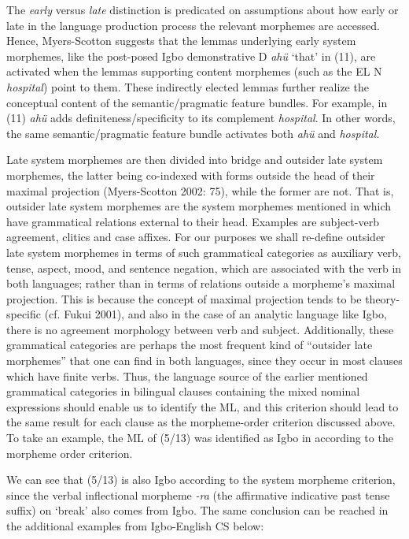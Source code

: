 \documentclass[output=paper]{langsci/langscibook}
\begin{document}
The \textit{early} versus \textit{late} distinction is predicated on assumptions about how early or late in the language production process the relevant morphemes are accessed. Hence, Myers-Scotton suggests that the lemmas underlying early system morphemes, like the post-posed Igbo demonstrative D \textit{ahü }‘that’ in (11), are activated when the lemmas supporting content morphemes (such as the EL N \textit{hospital}) point to them. These indirectly elected lemmas further realize the conceptual content of the semantic/pragmatic feature bundles. For example, in (11) \textit{ahü }adds definiteness/specificity to its complement \textit{hospital}. In other words, the same semantic/pragmatic feature bundle activates both \textit{ahü }and \textit{hospital. }

Late system morphemes are then divided into bridge and outsider late system morphemes, the latter being co-indexed with forms outside the head of their maximal projection (Myers-Scotton 2002: 75), while the former are not. That is, outsider late system morphemes are the system morphemes mentioned in  which have grammatical relations external to their head. Examples are subject-verb agreement, clitics and case affixes. For our purposes we shall re-define outsider late system morphemes in terms of such grammatical categories as auxiliary verb, tense, aspect, mood, and sentence negation, which are associated with the verb in both languages; rather than in terms of relations outside a morpheme’s maximal projection. This is because the concept of maximal projection tends to be theory-specific (cf. Fukui 2001), and also in the case of an analytic language like Igbo, there is no agreement morphology between verb and subject. Additionally, these grammatical categories are perhaps the most frequent kind of “outsider late morphemes” that one can find in both languages, since they occur in most clauses which have finite verbs. Thus, the language source of the earlier mentioned grammatical categories in bilingual clauses containing the mixed nominal expressions should enable us to identify the ML, and this criterion should lead to the same result for each clause as the morpheme-order criterion discussed above. To take an example, the ML of (5/13) was identified as Igbo in  according to the morpheme order criterion.

We can see that (5/13) is also Igbo according to the system morpheme criterion, since the verbal inflectional morpheme \textit{{}-ra} (the affirmative indicative past tense suffix) on ‘break’ also comes from Igbo. The same conclusion can be reached in the additional examples from Igbo-English CS below: 
\end{document}
